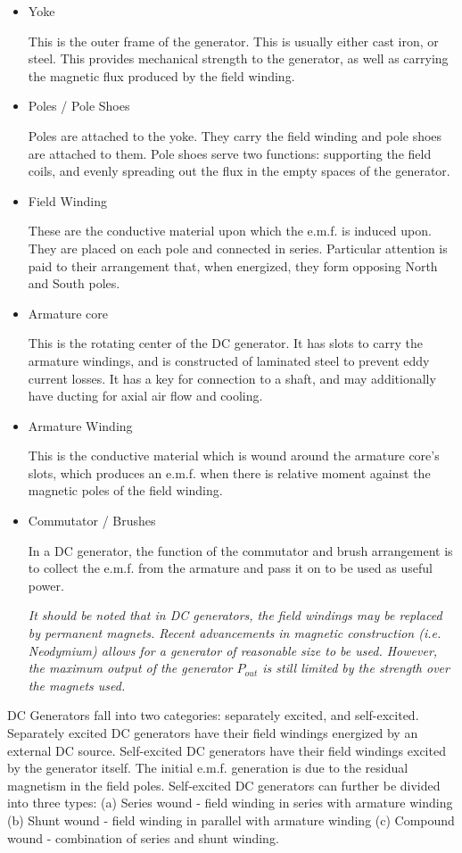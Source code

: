 \documentclass[11pt,a4paper]{article}
\begin{document}
\begin{itemize}
\item Yoke

This is the outer frame of the generator. This is usually either cast iron, or steel. This provides mechanical strength to the generator, as well as carrying the magnetic flux produced by the field winding.
\item Poles / Pole Shoes

Poles are attached to the yoke. They carry the field winding and pole shoes are attached to them. Pole shoes serve two functions: supporting the field coils, and evenly spreading out the flux in the empty spaces of the generator.
\item Field Winding

These are the conductive material upon which the e.m.f. is induced upon. They are placed on each pole and connected in series. Particular attention is paid to their arrangement that, when energized, they form opposing North and South poles.
\item Armature core

This is the rotating center of the DC generator. It has slots to carry the armature windings, and is constructed of laminated steel to prevent eddy current losses. It has a key for connection to a shaft, and may additionally have ducting for axial air flow and cooling.
\item Armature Winding

This is the conductive material which is wound around the armature core's slots, which produces an e.m.f. when there is relative moment against the magnetic poles of the field winding.
\item Commutator / Brushes

In a DC generator, the function of the commutator and brush arrangement is to collect the e.m.f. from the armature and pass it on to be used as useful power.

\textit{It should be noted that in DC generators, the field windings may be replaced by permanent magnets. Recent advancements in magnetic construction (i.e. Neodymium) allows for a generator of reasonable size to be used. However, the maximum output of the generator $P_{out}$ is still limited by the strength over the magnets used.}
\end{itemize}
DC Generators fall into two categories: separately excited, and self-excited. Separately excited DC generators have their field windings energized by an external DC source. Self-excited DC generators have their field windings excited by the generator itself. The initial e.m.f. generation is due to the residual magnetism in the field poles. Self-excited DC generators can further be divided into three types: (a) Series wound - field winding in series with armature winding (b) Shunt wound - field winding in parallel with armature winding (c) Compound wound - combination of series and shunt winding.
\end{document}
